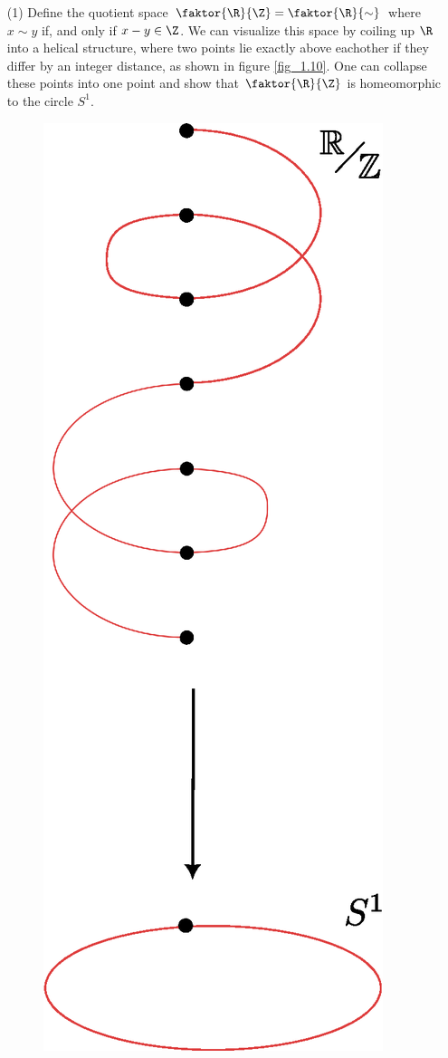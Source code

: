 \begin{example}
    \begin{enumerate}
        \item[(1)] Define the quotient space $\faktor{\R}{\Z}=\faktor{\R}{\sim}$
            where $x \sim y$ if, and only if  $x-y \in \Z$. We can visualize
            this space by coiling up  $\R$ into a helical structure, where two
            points lie exactly above eachother if they differ by an integer
            distance, as shown in figure \ref{fig_1.10}. One can collapse these
            points into one point and show that $\faktor{\R}{\Z}$ is
            homeomorphic to the circle $S^1$.

            \begin{figure}[h]
                \centering
                \includegraphics[scale=0.5]{Figures/chapter2/R_mod_Z.eps}

\end{figure}
\end{enumerate}
\end{example}
